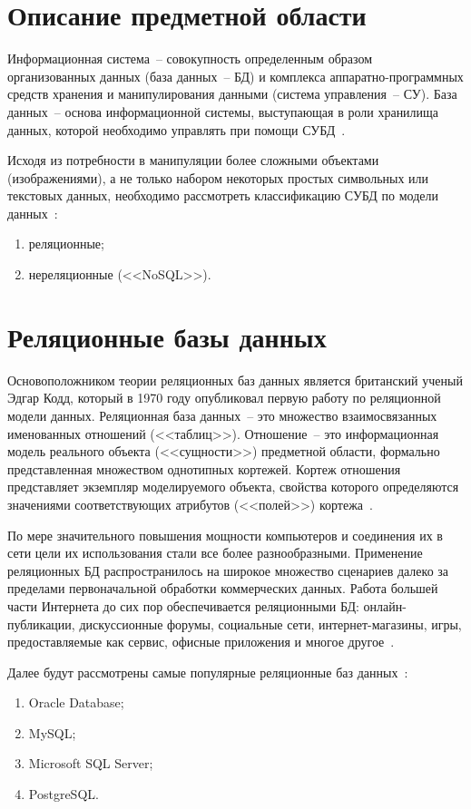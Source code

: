 \section{Описание предметной области}

Информационная система~-- совокупность определенным образом организованных данных (база данных~-- БД) и комплекса аппаратно-программных средств хранения и манипулирования данными (система управления~-- СУ).
База данных~-- основа информационной системы, выступающая в роли хранилища данных, которой необходимо управлять при помощи СУБД~\cite{baseDB}.

Исходя из потребности в манипуляции более сложными объектами (изображениями), а не только набором некоторых простых символьных или текстовых данных, необходимо рассмотреть классификацию СУБД по модели данных~\cite{highloadApps}:
\begin{enumerate}
	\item реляционные;
	\item нереляционные (<<NoSQL>>).
\end{enumerate}

\section{Реляционные базы данных}

Основоположником теории реляционных баз данных является британский ученый Эдгар Кодд, который в 1970 году опубликовал первую работу по реляционной модели данных.
Реляционная база данных~-- это множество взаимосвязанных именованных отношений (<<таблиц>>).
Отношение~-- это информационная модель реального объекта (<<сущности>>) предметной области, формально представленная множеством однотипных кортежей.
Кортеж отношения представляет экземпляр моделируемого объекта, свойства которого определяются значениями соответствующих атрибутов (<<полей>>) кортежа~\cite{baseDB}.

По мере значительного повышения мощности компьютеров и соединения их в сети цели их использования стали все более разнообразными.
Применение реляционных БД распространилось на широкое множество сценариев далеко за пределами первоначальной обработки коммерческих данных.
Работа большей части Интернета до сих пор обеспечивается реляционными БД: онлайн-публикации, дискуссионные форумы, социальные сети, интернет-магазины, игры, предоставляемые как сервис, офисные приложения и многое другое~\cite{highloadApps}.

Далее будут рассмотрены самые популярные реляционные баз данных~\cite{popularDB}:
\begin{enumerate}
	\item Oracle Database;
	\item MySQL;
	\item Microsoft SQL Server;
	\item PostgreSQL.
\end{enumerate}

